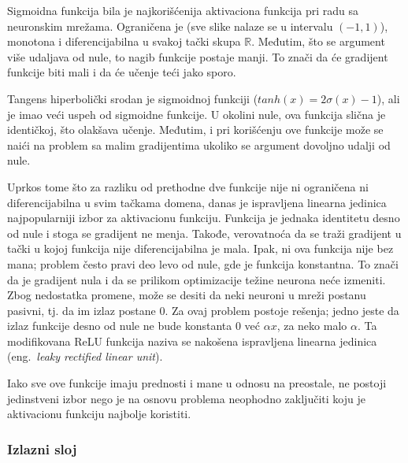 Sigmoidna funkcija bila je najkorišćenija aktivaciona funkcija pri radu sa neuronskim mrežama. Ograničena je (sve slike nalaze se u intervalu $(-1, 1)$), monotona i diferencijabilna u svakoj tački skupa $\mathbb{R}$. Međutim, što se argument više udaljava od nule, to nagib funkcije postaje manji. To znači da će gradijent funkcije biti mali i da će učenje teći jako sporo. 
\par 
Tangens hiperbolički srodan je sigmoidnoj funkciji ($tanh(x) = 2\sigma (x) - 1$), ali je imao veći uspeh od sigmoidne funkcije.  U okolini nule, ova funkcija slična je identičkoj, što olakšava učenje. Međutim, i pri korišćenju ove funkcije može se naići na problem sa malim gradijentima ukoliko se argument dovoljno udalji od nule. 
\par 
Uprkos tome što za razliku od prethodne dve funkcije nije ni ograničena ni diferencijabilna u svim tačkama domena, danas je ispravljena linearna jedinica najpopularniji izbor za aktivacionu funkciju. Funkcija je jednaka identitetu desno od nule i stoga se gradijent ne menja. Takođe, verovatnoća da se traži gradijent u tački u kojoj funkcija nije diferencijabilna je mala. Ipak, ni ova funkcija nije bez mana; problem često pravi deo levo od nule, gde je funkcija konstantna. To znači da je gradijent nula i da se prilikom optimizacije težine neurona neće izmeniti. Zbog nedostatka promene, može se desiti da neki neuroni u mreži postanu pasivni, tj. da im izlaz postane $0$. Za ovaj problem postoje rešenja; jedno jeste da izlaz funkcije desno od nule ne bude konstanta $0$ već $\alpha x$, za neko malo $\alpha$. Ta modifikovana ReLU funkcija naziva se nakošena ispravljena linearna jedinica (eng.~{\em leaky rectified linear unit}). 
\par 
Iako sve ove funkcije imaju prednosti i mane u odnosu na preostale, ne postoji jedinstveni izbor nego je na osnovu problema neophodno zaključiti koju je aktivacionu funkciju najbolje koristiti.

\subsubsection{Izlazni sloj}

